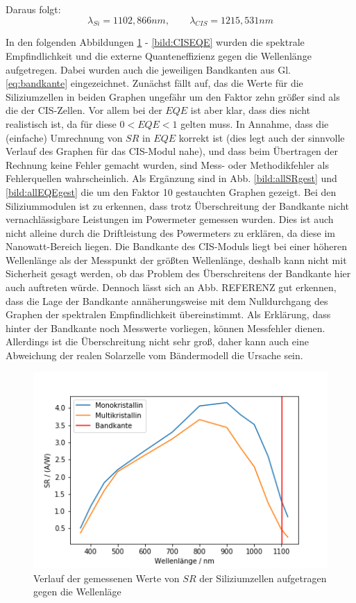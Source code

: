 Daraus folgt: \\

\begin{equation}
\lambda_{Si} = 1102,866 nm, \qquad \lambda_{CIS} = 1215,531 nm
\label{eq:bandkante}
\end{equation}

In den folgenden Abbildungen \ref{bild:SiSRMess} - \ref{bild:CISEQE} wurden die spektrale Empfindlichkeit und die externe Quanteneffizienz gegen die Wellenlänge aufgetregen.
Dabei wurden auch die jeweiligen Bandkanten aus Gl. \ref{eq:bandkante} eingezeichnet.
Zunächst fällt auf, das die Werte für die Siliziumzellen in beiden Graphen ungefähr um den Faktor zehn größer sind als die der 
CIS-Zellen. Vor allem bei der $EQE$ ist aber klar, dass dies nicht realistisch ist, da für diese $0 < EQE < 1$ gelten muss.
In Annahme, dass die (einfache) Umrechnung von $SR$ in $EQE$ korrekt ist (dies legt auch der sinnvolle Verlauf des Graphen für 
das CIS-Modul nahe), und dass beim Übertragen der Rechnung keine Fehler gemacht wurden, sind Mess- oder Methodikfehler als Fehlerquellen
wahrscheinlich. Als Ergänzung sind in Abb. \ref{bild:allSRgest} und \ref{bild:allEQEgest} die um den Faktor 10 gestauchten Graphen gezeigt.
 Bei den Siliziummodulen ist zu erkennen, dass trotz 
Überschreitung der Bandkante nicht vernachlässigbare Leistungen im Powermeter gemessen wurden. Dies ist auch nicht alleine durch die 
Driftleistung des Powermeters zu erklären, da diese im Nanowatt-Bereich liegen. 
Die Bandkante des CIS-Moduls liegt bei einer höheren Wellenlänge als der Messpunkt der größten Wellenlänge, deshalb kann nicht mit 
Sicherheit gesagt werden, ob das Problem des Überschreitens der Bandkante hier auch auftreten würde. Dennoch lässt sich an Abb. 
REFERENZ gut erkennen, dass die Lage der Bandkante annäherungsweise mit dem Nulldurchgang des Graphen der spektralen Empfindlichkeit
übereinstimmt. Als Erklärung, dass hinter der Bandkante noch Messwerte vorliegen, können Messfehler dienen. Allerdings ist die 
Überschreitung nicht sehr groß, daher kann auch eine Abweichung der realen Solarzelle vom Bändermodell die Ursache sein. \\

\begin{figure}[h]
    \centering
    \includegraphics[scale=0.75]{Bilder/32SiSR.png}
    \caption{Verlauf der gemessenen Werte von $SR$ der Siliziumzellen aufgetragen gegen die Wellenläge}
    \label{bild:SiSRMess}
\end{figure}

